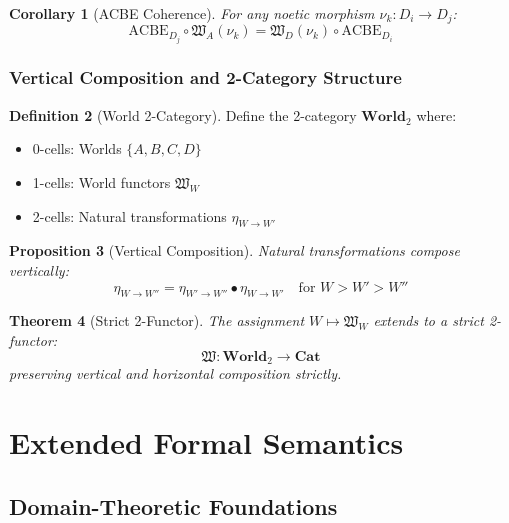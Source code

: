\documentclass[11pt,twoside,openright]{book}
\theoremstyle{definition}
\newtheorem{definition}{Definition}[chapter]
\theoremstyle{plain}
\newtheorem{theorem}[definition]{Theorem}
\newtheorem{proposition}[definition]{Proposition}
\newtheorem{corollary}[definition]{Corollary}
\theoremstyle{remark}
\newcommand{\noe}[1]{\nu_{#1}}
\newcommand{\NatTrans}[2]{\eta_{#1 \to #2}}
\newcommand{\WorldFunctor}[1]{\mathfrak{W}_{#1}}
\begin{document}
\begin{corollary}[ACBE Coherence]
\label{cor:acbe-coherence}
For any noetic morphism $\noe{k} : D_i \to D_j$:
\[
\mathrm{ACBE}_{D_j} \circ \WorldFunctor{A}(\noe{k}) = \WorldFunctor{D}(\noe{k}) \circ \mathrm{ACBE}_{D_i}
\]
\end{corollary}

\section{Vertical Composition and 2-Category Structure}

\begin{definition}[World 2-Category]
\label{def:world-2-cat}
Define the 2-category $\mathbf{World}_2$ where:
\begin{itemize}
  \item 0-cells: Worlds $\{A, B, C, D\}$
  \item 1-cells: World functors $\WorldFunctor{W}$
  \item 2-cells: Natural transformations $\NatTrans{W}{W'}$
\end{itemize}
\end{definition}

\begin{proposition}[Vertical Composition]
\label{prop:vertical-comp}
Natural transformations compose vertically:
\[
\NatTrans{W}{W''} = \NatTrans{W'}{W''} \bullet \NatTrans{W}{W'} \quad \text{for } W > W' > W''
\]
\end{proposition}

\begin{theorem}[Strict 2-Functor]
\label{thm:strict-2-functor}
The assignment $W \mapsto \WorldFunctor{W}$ extends to a strict 2-functor:
\[
\mathfrak{W} : \mathbf{World}_2 \to \mathbf{Cat}
\]
preserving vertical and horizontal composition strictly.
\end{theorem}

\part{Extended Formal Semantics}

\chapter{Domain-Theoretic Foundations}
\label{ch:domain-theory}
\end{document}
